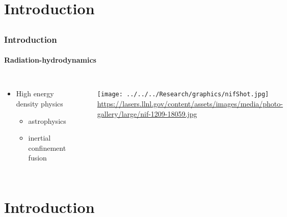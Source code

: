 \documentclass[compress,t]{beamer}
\begin{document}
\section{Introduction}
\subsection{}

\begin{frame}
\frametitle{Introduction}
\framesubtitle{Radiation-hydrodynamics}

\begin{columns}[T]

\begin{itemize}
\item{High energy density physics}
\begin{itemize}
\item{astrophysics}
\item{inertial confinement fusion}
\end{itemize}
\end{itemize}

\begin{figure}[!h]
\flushright
\texttt{[image: ../../../Research/graphics/nifShot.jpg]}
\vspace{-8pt}
\flushright\tiny{\url{https://lasers.llnl.gov/content/assets/images/media/photo-gallery/large/nif-1209-18059.jpg}}
\end{figure}

\end{columns}

\end{frame}

\section{Introduction}
\subsection{}
\end{document}
